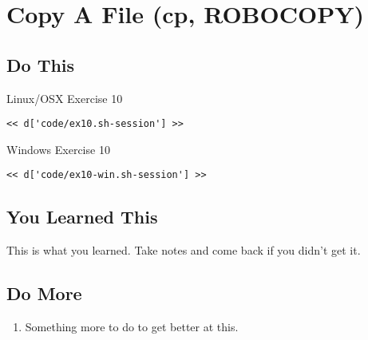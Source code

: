 \chapter{Copy A File (cp, ROBOCOPY)}

\section{Do This}

\begin{code}{Linux/OSX Exercise 10}
\begin{Verbatim}
<< d['code/ex10.sh-session'] >>
\end{Verbatim}
\end{code}

\begin{code}{Windows Exercise 10}
\begin{Verbatim}
<< d['code/ex10-win.sh-session'] >>
\end{Verbatim}
\end{code}

\section{You Learned This}

This is what you learned.  Take notes and come back if you didn't get it.

\section{Do More}

\begin{enumerate}
\item Something more to do to get better at this.
\end{enumerate}

